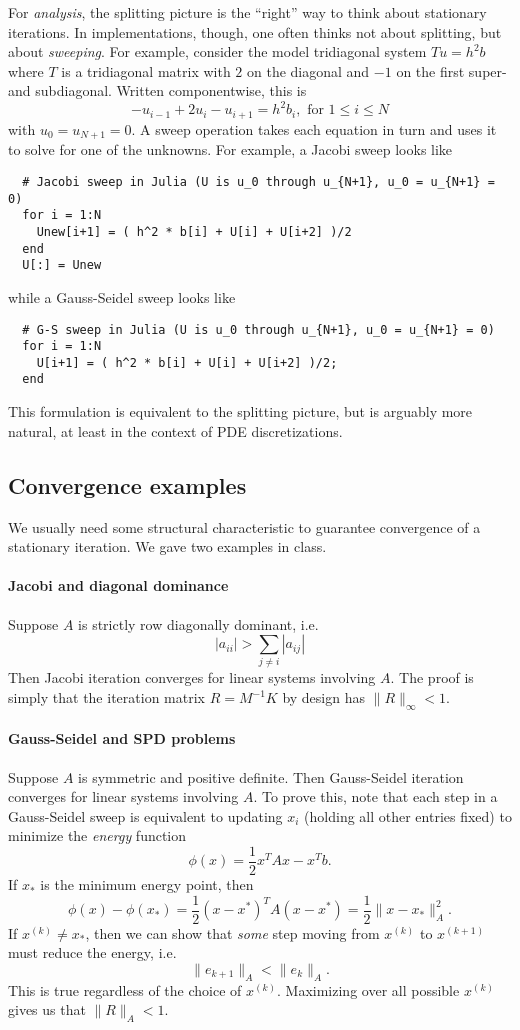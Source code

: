 \documentclass[12pt, leqno]{article}
\begin{document}
For {\em analysis}, the splitting picture is the ``right'' way to
think about stationary iterations.  In implementations, though, one often
thinks not about splitting, but about {\em sweeping}.  For example,
consider the model tridiagonal system $Tu = h^2 b$ where $T$ is a
tridiagonal matrix with $2$ on the diagonal and $-1$ on the first
super- and subdiagonal.  Written componentwise, this is
\[
  -u_{i-1} + 2 u_i - u_{i+1} = h^2 b_i, \mbox{ for } 1 \leq i \leq N
\]
with $u_0 = u_{N+1} = 0$.  A sweep operation takes each equation in
turn and uses it to solve for one of the unknowns.  For example,
a Jacobi sweep looks like
\begin{lstlisting}
  # Jacobi sweep in Julia (U is u_0 through u_{N+1}, u_0 = u_{N+1} = 0)
  for i = 1:N
    Unew[i+1] = ( h^2 * b[i] + U[i] + U[i+2] )/2
  end
  U[:] = Unew
\end{lstlisting}
while a Gauss-Seidel sweep looks like
\begin{lstlisting}
  # G-S sweep in Julia (U is u_0 through u_{N+1}, u_0 = u_{N+1} = 0)
  for i = 1:N
    U[i+1] = ( h^2 * b[i] + U[i] + U[i+2] )/2;
  end
\end{lstlisting}
This formulation is equivalent to the splitting picture, but is
arguably more natural, at least in the context of PDE discretizations.

\subsection{Convergence examples}

We usually need some structural characteristic to guarantee
convergence of a stationary iteration.  We gave two examples
in class.

\paragraph{Jacobi and diagonal dominance}
Suppose $A$ is strictly row diagonally dominant, i.e.
\[
  |a_{ii}| > \sum_{j \neq i} |a_{ij}|
\]
Then Jacobi iteration converges for linear systems involving $A$.
The proof is simply that the iteration matrix $R = M^{-1} K$ by
design has $\|R\|_\infty < 1$.

\paragraph{Gauss-Seidel and SPD problems}
Suppose $A$ is symmetric and positive definite.  Then Gauss-Seidel
iteration converges for linear systems involving $A$.  To prove this,
note that each step in a Gauss-Seidel sweep is equivalent to updating
$x_i$ (holding all other entries fixed) to minimize the {\em energy}
function
\[
  \phi(x) = \frac{1}{2} x^T A x - x^T b.
\]
If $x_*$ is the minimum energy point, then
\[
  \phi(x)-\phi(x_*) = \frac{1}{2} (x-x^*)^T A (x-x^*) = \frac{1}{2} \|x-x_*\|_A^2.
\]
If $x^{(k)} \neq x_*$, then we can show that {\em some} step moving
from $x^{(k)}$ to $x^{(k+1)}$ must reduce the energy, i.e.
\[
  \|e_{k+1}\|_A < \|e_k\|_A.
\]
This is true regardless of the choice of $x^{(k)}$.  Maximizing
over all possible $x^{(k)}$ gives us that $\|R\|_A < 1$.
\end{document}
